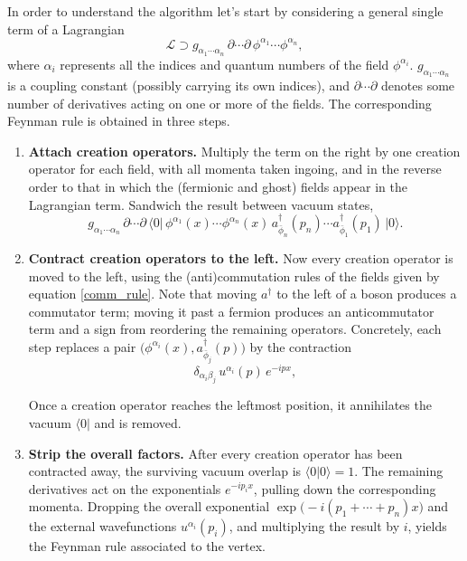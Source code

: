 In order to understand the algorithm let's start by considering a general single term of a Lagrangian
\begin{equation}\label{eq:general-term}
    \mathcal L \supset g_{\alpha_1 \cdots \alpha_n}\,
    \partial \cdots \partial\, \phi^{\alpha_1} \cdots \phi^{\alpha_n},
\end{equation}
where $\alpha_i$ represents all the indices and quantum numbers of the field $\phi^{\alpha_i}$. $g_{\alpha_1\cdots\alpha_n}$ is a coupling constant (possibly
carrying its own indices), and $\partial \cdots \partial$ denotes some
number of derivatives acting on one or more of the fields. The
corresponding Feynman rule is obtained in three steps.

\begin{enumerate}
\item \textbf{Attach creation operators.} Multiply the term on the
right by one creation operator for each field, with all momenta taken
ingoing, and in the reverse order to that in which the (fermionic and
ghost) fields appear in the Lagrangian term. Sandwich the result
between vacuum states,
\begin{equation}
    g_{\alpha_1\cdots\alpha_n}\, \partial\cdots\partial\,
    \big\langle 0 \big|\,
    \phi^{\alpha_1}(x) \cdots \phi^{\alpha_n}(x)\,
    a^\dagger_{\bar\phi_n}(p_n) \cdots a^\dagger_{\bar\phi_1}(p_1)
    \,\big| 0 \big\rangle.
\end{equation}


\item \textbf{Contract creation operators to the left.} Now every creation operator is moved to the left, using the (anti)commutation rules of the fields given by equation \ref{comm_rule}. Note that moving $a^\dagger$ to the left of a boson produces a commutator term; moving it past a fermion produces an anticommutator term and a sign from reordering the
remaining operators. Concretely, each step replaces a pair
$\big(\phi^{\alpha_i}(x), a^\dagger_{\bar\phi_j}(p)\big)$ by the
contraction
\begin{equation}
    \delta_{\alpha_i\beta_j}\, u^{\alpha_i}(p)\, e^{-ipx},
\end{equation}

Once a creation operator reaches the leftmost position, it annihilates the vacuum $\langle 0|$ and is removed.

\item \textbf{Strip the overall factors.} After every creation
operator has been contracted away, the surviving vacuum overlap is
$\langle 0 | 0 \rangle = 1$. The remaining derivatives act on the
exponentials $e^{-ip_i x}$, pulling down the corresponding momenta.
Dropping the overall exponential $\exp\!\big(-i(p_1 + \cdots +
p_n)x\big)$ and the external wavefunctions
$u^{\alpha_i}(p_i)$, and multiplying the result by $i$, yields the
Feynman rule associated to the vertex.
\end{enumerate}

